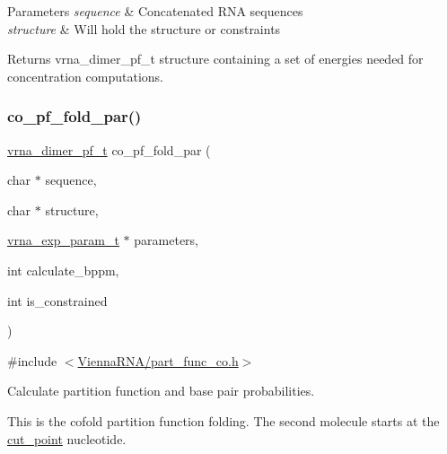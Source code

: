 \begin{DoxyParams}{Parameters}
{\em sequence} & Concatenated R\+NA sequences \\
\hline
{\em structure} & Will hold the structure or constraints \\
\hline
\end{DoxyParams}
\begin{DoxyReturn}{Returns}
vrna\+\_\+dimer\+\_\+pf\+\_\+t structure containing a set of energies needed for concentration computations. 
\end{DoxyReturn}
\mbox{\label{group__part__func__global__deprecated_gaabfc6cb6d02b8f08ac4c92f4f5b125d9}} 
\subsubsection{\texorpdfstring{co\+\_\+pf\+\_\+fold\+\_\+par()}{co\_pf\_fold\_par()}}
{\footnotesize\ttfamily \hyperlink{group__pf__cofold_ga444df1587c9a2ca15b8eb25188f629c3}{vrna\+\_\+dimer\+\_\+pf\+\_\+t} co\+\_\+pf\+\_\+fold\+\_\+par (\begin{DoxyParamCaption}\item[{char $\ast$}]{sequence,  }\item[{char $\ast$}]{structure,  }\item[{\hyperlink{group__energy__parameters_ga01d8b92fe734df8d79a6169482c7d8d8}{vrna\+\_\+exp\+\_\+param\+\_\+t} $\ast$}]{parameters,  }\item[{int}]{calculate\+\_\+bppm,  }\item[{int}]{is\+\_\+constrained }\end{DoxyParamCaption})}



{\ttfamily \#include $<$\hyperlink{part__func__co_8h}{Vienna\+R\+N\+A/part\+\_\+func\+\_\+co.\+h}$>$}



Calculate partition function and base pair probabilities. 

This is the cofold partition function folding. The second molecule starts at the \hyperlink{fold__vars_8h_ab9b2c3a37a5516614c06d0ab54b97cda}{cut\+\_\+point} nucleotide.

